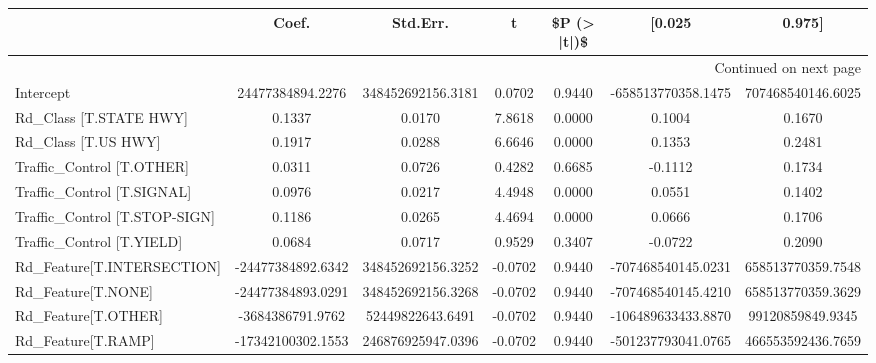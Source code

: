 \begin{longtable}{p{4cm}cccccc}
\toprule
{} &             Coef. &          Std.Err. &       t &  \$P (> |t|)\$ &             [0.025 &            0.975] \\
\midrule
\endhead
\midrule
\multicolumn{7}{r}{{Continued on next page}} \\
\midrule
\endfoot

\bottomrule
\endlastfoot
Intercept                                          &  24477384894.2276 & 348452692156.3181 &  0.0702 &       0.9440 & -658513770358.1475 & 707468540146.6025 \\
Rd\_Class [T.STATE HWY]                             &            0.1337 &            0.0170 &  7.8618 &       0.0000 &             0.1004 &            0.1670 \\
Rd\_Class [T.US HWY]                                &            0.1917 &            0.0288 &  6.6646 &       0.0000 &             0.1353 &            0.2481 \\
Traffic\_Control [T.OTHER]                          &            0.0311 &            0.0726 &  0.4282 &       0.6685 &            -0.1112 &            0.1734 \\
Traffic\_Control [T.SIGNAL]                         &            0.0976 &            0.0217 &  4.4948 &       0.0000 &             0.0551 &            0.1402 \\
Traffic\_Control [T.STOP-SIGN]                      &            0.1186 &            0.0265 &  4.4694 &       0.0000 &             0.0666 &            0.1706 \\
Traffic\_Control [T.YIELD]                          &            0.0684 &            0.0717 &  0.9529 &       0.3407 &            -0.0722 &            0.2090 \\
Rd\_Feature[T.INTERSECTION]                         & -24477384892.6342 & 348452692156.3252 & -0.0702 &       0.9440 & -707468540145.0231 & 658513770359.7548 \\
Rd\_Feature[T.NONE]                                 & -24477384893.0291 & 348452692156.3268 & -0.0702 &       0.9440 & -707468540145.4210 & 658513770359.3629 \\
Rd\_Feature[T.OTHER]                                &  -3684386791.9762 &  52449822643.6491 & -0.0702 &       0.9440 & -106489633433.8870 &  99120859849.9345 \\
Rd\_Feature[T.RAMP]                                 & -17342100302.1553 & 246876925947.0396 & -0.0702 &       0.9440 & -501237793041.0765 & 466553592436.7659 \\

\end{longtable}
